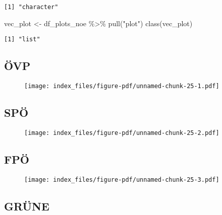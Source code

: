 \documentclass[
  letterpaper,
  DIV=11,
  numbers=noendperiod,
  oneside]{scrartcl}
\newenvironment{Shaded}{\begin{snugshade}}{\end{snugshade}}
\newcommand{\FunctionTok}[1]{\textcolor[rgb]{0.28,0.35,0.67}{#1}}
\newcommand{\NormalTok}[1]{\textcolor[rgb]{0.00,0.23,0.31}{#1}}
\newcommand{\OtherTok}[1]{\textcolor[rgb]{0.00,0.23,0.31}{#1}}
\newcommand{\SpecialCharTok}[1]{\textcolor[rgb]{0.37,0.37,0.37}{#1}}
\newcommand{\StringTok}[1]{\textcolor[rgb]{0.13,0.47,0.30}{#1}}
\begin{document}
\begin{verbatim}
[1] "character"
\end{verbatim}

\begin{Shaded}
\begin{Highlighting}[]
\NormalTok{vec\_plot }\OtherTok{\textless{}{-}}\NormalTok{ df\_plots\_noe }\SpecialCharTok{\%\textgreater{}\%} \FunctionTok{pull}\NormalTok{(}\StringTok{"plot"}\NormalTok{)}
\FunctionTok{class}\NormalTok{(vec\_plot)}
\end{Highlighting}
\end{Shaded}

\begin{verbatim}
[1] "list"
\end{verbatim}

\begin{figure*}

\subsection{ÖVP}

\begin{figure}[H]

\texttt{[image: index\_files/figure-pdf/unnamed-chunk-25-1.pdf]} \hfill{}

\end{figure}

\subsection{SPÖ}

\begin{figure}[H]

\texttt{[image: index\_files/figure-pdf/unnamed-chunk-25-2.pdf]} \hfill{}

\end{figure}

\subsection{FPÖ}

\begin{figure}[H]

\texttt{[image: index\_files/figure-pdf/unnamed-chunk-25-3.pdf]} \hfill{}

\end{figure}

\subsection{GRÜNE}


\end{figure*}
\end{document}
